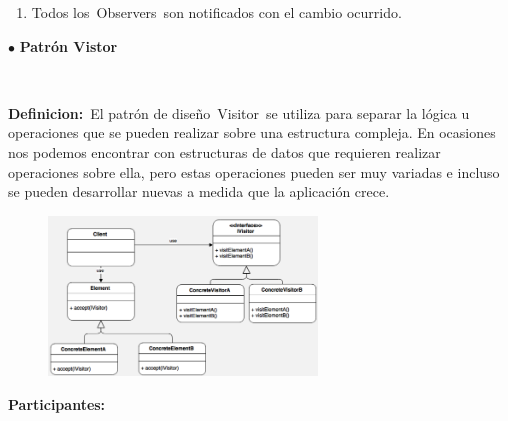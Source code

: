 \documentclass[12pt]{article}
\begin{document}
\begin{multicols}{2}
\begin{enumerate}[label*={\fontsize{9pt}{9pt}\selectfont \arabic*.}]
	\item {\fontsize{9pt}{10.8pt}\selectfont Todos los Observers son notificados con el cambio ocurrido. \par}
\end{enumerate}\par


\vspace{\baselineskip}
{\fontsize{9pt}{10.8pt}\selectfont $\bullet$ \tab \textbf{ Patrón Vistor}\par}\par

\textbf{ }{\fontsize{9pt}{10.8pt}\selectfont \textbf{Definicion:} El patrón de diseño Visitor se utiliza para separar la lógica u operaciones que se pueden realizar sobre una estructura compleja. En ocasiones nos podemos encontrar con estructuras de datos que requieren realizar operaciones sobre ella, pero estas operaciones pueden ser muy variadas e incluso se pueden desarrollar nuevas a medida que la aplicación crece. \par}\par




\begin{figure}[H]
	\begin{Center}
		\includegraphics[width=2.81in,height=1.67in]{./media/image13.png}
	\end{Center}
\end{figure}



\par


\vspace{\baselineskip}
{\fontsize{9pt}{10.8pt}\selectfont \textbf{Participantes: }\par}\par


\end{multicols}
\end{document}
